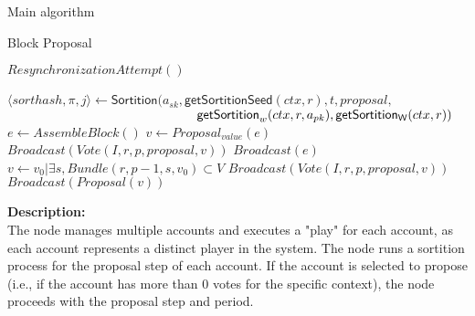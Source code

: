\documentclass[10pt,a4paper]{article}
\begin{document}
\begin{section}{Main algorithm}
\begin{subsection}{Block Proposal}\label{ssect:blockproposal}

    \begin{algorithm}
        \begin{algorithmic}[1]

            \State $ResynchronizationAttempt()$

                \State $\langle sorthash, \pi, j\rangle\gets 
                \mathsf{Sortition}(
                    a_{sk}, 
                    \mathsf{getSortitionSeed}(ctx, r), 
                    t, 
                    proposal, $ \newline
                    ${}$ ${\hskip 5.2cm}\mathsf{getSortition}_w(ctx, r, a_{pk}), 
                    \mathsf{getSortition_W}(ctx, r)
                )$
                        \State $e \gets AssembleBlock()$
                        \State $v \gets Proposal_{value}(e)$
                        \State $Broadcast(Vote(I, r, p, proposal, v))$
                        \State $Broadcast(e)$
                    \Else
                        \State $v \gets v_0 | \exists s, Bundle(r,p-1,s,v_0) \subset V$
                        \State $Broadcast(Vote(I, r, p, proposal, v))$
                            \State $Broadcast(Proposal(v))$
                        \EndIf
                    \EndIf
                \EndIf
            \EndFor
        \EndFunction
        \end{algorithmic}
        \caption{\underline{Block proposal}}
    \end{algorithm}

\newpage

\noindent \textbf{Description:}\\
The node manages multiple accounts and executes a "play" for each account, 
as each account represents a distinct player in the system. The node runs a 
sortition process for the proposal step of each account. If the account is selected 
to propose (i.e., if the account has more than 0 votes for the specific context), 
the node proceeds with the proposal step and period.


\end{subsection}
\end{section}
\end{document}
